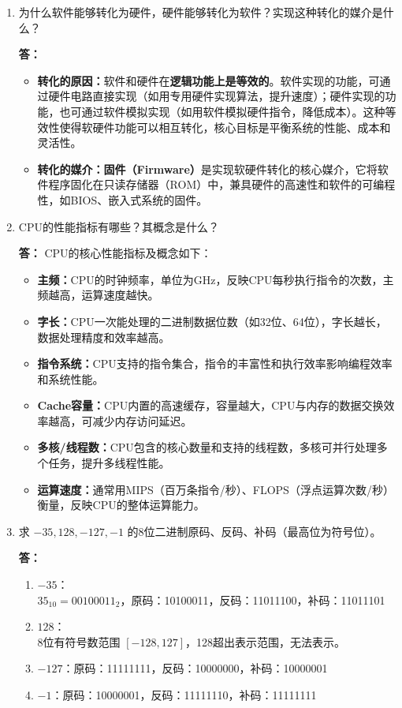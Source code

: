 \documentclass{article}
\begin{document}
\begin{enumerate}[label=\arabic*.]
    \item 为什么软件能够转化为硬件，硬件能够转化为软件？实现这种转化的媒介是什么？
    
    \textbf{答：}
    \begin{itemize}
        \item \textbf{转化的原因：}软件和硬件在\textbf{逻辑功能上是等效的}。软件实现的功能，可通过硬件电路直接实现（如用专用硬件实现算法，提升速度）；硬件实现的功能，也可通过软件模拟实现（如用软件模拟硬件指令，降低成本）。这种等效性使得软硬件功能可以相互转化，核心目标是平衡系统的性能、成本和灵活性。
        \item \textbf{转化的媒介：}\textbf{固件（Firmware）}是实现软硬件转化的核心媒介，它将软件程序固化在只读存储器（ROM）中，兼具硬件的高速性和软件的可编程性，如BIOS、嵌入式系统的固件。
    \end{itemize}

    \item CPU的性能指标有哪些？其概念是什么？
    
    \textbf{答：}
    CPU的核心性能指标及概念如下：
    \begin{itemize}
        \item \textbf{主频：}CPU的时钟频率，单位为GHz，反映CPU每秒执行指令的次数，主频越高，运算速度越快。
        \item \textbf{字长：}CPU一次能处理的二进制数据位数（如32位、64位），字长越长，数据处理精度和效率越高。
        \item \textbf{指令系统：}CPU支持的指令集合，指令的丰富性和执行效率影响编程效率和系统性能。
        \item \textbf{Cache容量：}CPU内置的高速缓存，容量越大，CPU与内存的数据交换效率越高，可减少内存访问延迟。
        \item \textbf{多核/线程数：}CPU包含的核心数量和支持的线程数，多核可并行处理多个任务，提升多线程性能。
        \item \textbf{运算速度：}通常用MIPS（百万条指令/秒）、FLOPS（浮点运算次数/秒）衡量，反映CPU的整体运算能力。
    \end{itemize}

    \item 求 $-35, 128, -127, -1$ 的8位二进制原码、反码、补码（最高位为符号位）。
    
    \textbf{答：}
    \begin{enumerate}[label=(\arabic*)]
        \item $-35$：\\
        $35_{10}=00100011_2$，原码：10100011，反码：11011100，补码：11011101
        \item $128$：\\
        8位有符号数范围 $[-128,127]$，128超出表示范围，无法表示。
        \item $-127$：原码：11111111，反码：10000000，补码：10000001
        \item $-1$：原码：10000001，反码：11111110，补码：11111111
    \end{enumerate}


\end{enumerate}
\end{document}
